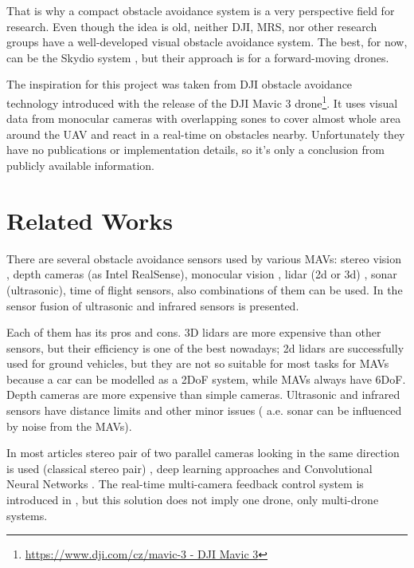 That is why a compact obstacle avoidance system is a very perspective field for research. 
Even though the idea is old, neither DJI, MRS, nor other research groups have a well-developed visual obstacle avoidance system. 
The best, for now, can be the Skydio system , but their approach is for a forward-moving drones.

The inspiration for this project was taken from DJI obstacle avoidance technology introduced with the release of the DJI Mavic 3 drone\footnote{\href{https://www.dji.com/cz/mavic-3}{https://www.dji.com/cz/mavic-3 - DJI Mavic 3}}. 
It uses visual data from monocular cameras with overlapping sones to cover almost whole area around the UAV and react in a real-time on obstacles nearby. 
Unfortunately they have no publications or implementation details, so it's only a conclusion from publicly available information.

\section{Related Works}
There are several obstacle avoidance sensors used by various MAVs: stereo vision \cite{Ruf2018}, depth cameras (as Intel RealSense), monocular vision \cite{Mejias2010}, lidar (2d or 3d) \cite{Ramasamy2016}, sonar (ultrasonic), time of flight sensors, also combinations of them can be used. 
In \cite{Rambabu2015} the sensor fusion of ultrasonic and infrared sensors is presented.

Each of them has its pros and cons. 
3D lidars are more expensive than other sensors, but their efficiency is one of the best nowadays; 2d lidars are successfully used for ground vehicles, but they are not so suitable for most tasks for MAVs because a car can be modelled as a 2DoF system, while MAVs always have 6DoF. 
Depth cameras are more expensive than simple cameras. Ultrasonic and infrared sensors have distance limits and other minor issues ( a.e. sonar can be influenced by noise from the MAVs). 

In most articles stereo pair of two parallel cameras looking in the same direction is used (classical stereo pair) \cite{Yu2018, Lin2021, Xiao2019}, deep learning approaches \cite{Back2020, FragaLamas2019, Park2020, Roghair2021} and Convolutional Neural Networks \cite{Yu2013, Ma2020}. 
The real-time multi-camera feedback control system is introduced in \cite{He2021}, but this solution does not imply one drone, only multi-drone systems.

